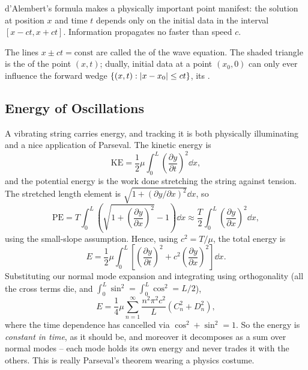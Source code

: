 \documentclass[a4paper]{scrartcl}
\begin{document}
d'Alembert's formula makes a physically important point manifest: the solution at position $x$ and time $t$ depends only on the initial data in the interval $[x - ct, x + ct]$. Information propagates no faster than speed $c$.

\begin{center}
\end{center}

The lines $x \pm ct = \text{const}$ are called the  of the wave equation. The shaded triangle is the  of the point $(x, t)$; dually, initial data at a point $(x_0, 0)$ can only ever influence the forward wedge $\{(x,t) : \lvert x - x_0\rvert \leq ct\}$, its .

\subsection{Energy of Oscillations}

A vibrating string carries energy, and tracking it is both physically illuminating and a nice application of Parseval. The kinetic energy is
$$
\text{KE} = \frac{1}{2}\mu \int_0^L \left(\frac{\partial y}{\partial t}\right)^2 \dd x,
$$
and the potential energy is the work done stretching the string against tension. The stretched length element is $\sqrt{1 + (\partial y/\partial x)^2}\dd x$, so
$$
\text{PE} = T \int_0^L \left(\sqrt{1 + \left(\frac{\partial y}{\partial x}\right)^2} - 1\right) \dd x \approx \frac{T}{2} \int_0^L \left(\frac{\partial y}{\partial x}\right)^2 \dd x,
$$
using the small-slope assumption. Hence, using $c^2 = T/\mu$, the total energy is
$$
E = \frac{1}{2} \mu \int_0^L \left[\left(\frac{\partial y}{\partial t}\right)^2 + c^2 \left(\frac{\partial y}{\partial x}\right)^2\right] \dd x.
$$
Substituting our normal mode expansion and integrating using orthogonality (all the cross terms die, and $\int_0^L \sin^2 = \int_0^L \cos^2 = L/2$),
$$
E = \frac{1}{4} \mu \sum_{n = 1}^{\infty} \frac{n^2 \pi^2 c^2}{L}\left(C_n^2 + D_n^2\right),
$$
where the time dependence has cancelled via $\cos^2 + \sin^2 = 1$. So the energy is \emph{constant in time}, as it should be, and moreover it decomposes as a sum over normal modes -- each mode holds its own energy and never trades it with the others. This is really Parseval's theorem wearing a physics costume.
\end{document}
